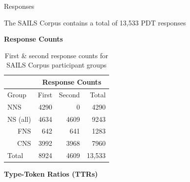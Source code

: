 \documentclass[final,t]{beamer}
\begin{document}
\begin{frame}{}
\begin{columns}[t]
\begin{column}{.33\linewidth}

\begin{block}{Responses}
\begin{center}
\begin{minipage}{.85\textwidth}

The SAILS Corpus contains a total of 13,533 PDT responses

\begin{center}
  \textbf{Response Counts}
\end{center}

\vspace{.5em}
\begin{table}[htb!]
\begin{center}
\begin{tabular}{|l||r|r||r|}
\hline
& \multicolumn{3}{|c|}{Response Counts} \\
\hline
 Group & First & Second & Total \\
\hline
\hline
NNS & 4290 & 0 & 4290 \\
\hline
\hline
NS (all) & 4634 & 4609 & 9243 \\ 
\hline
\multicolumn{1}{|r||}{FNS} & 642 & 641 & 1283 \\ 
\hline
\multicolumn{1}{|r||}{CNS} & 3992 & 3968 & 7960 \\
\hline
\hline
Total & 8924 & 4609 & 13,533 \\
\hline
\end{tabular}
\caption{\label{tab:response-counts} First \& second response counts for SAILS Corpus participant groups}
\end{center}
\end{table}


\begin{center}
  \textbf{Type-Token Ratios (TTRs)}
\end{center}


\end{minipage}
\end{center}
\end{block}
\end{column}
\end{columns}
\end{frame}
\end{document}
